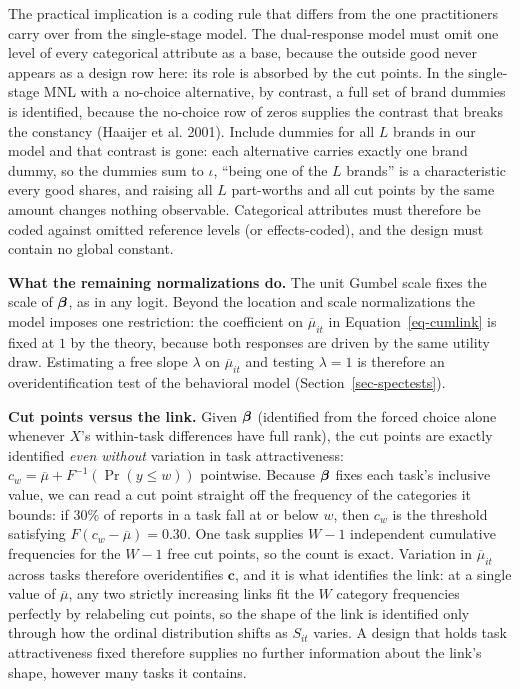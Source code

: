 \documentclass[
  letterpaper,
  DIV=11,
  numbers=noendperiod]{scrartcl}
\theoremstyle{plain}
\theoremstyle{plain}
\theoremstyle{plain}
\theoremstyle{remark}
\begin{document}
The practical implication is a coding rule that differs from the one
practitioners carry over from the single-stage model. The dual-response
model must omit one level of every categorical attribute as a base,
because the outside good never appears as a design row here: its role is
absorbed by the cut points. In the single-stage MNL with a no-choice
alternative, by contrast, a full set of brand dummies is identified,
because the no-choice row of zeros supplies the contrast that breaks the
constancy (Haaijer et al. 2001). Include dummies for all \(L\) brands in
our model and that contrast is gone: each alternative carries exactly
one brand dummy, so the dummies sum to \(\iota\), ``being one of the
\(L\) brands'' is a characteristic every good shares, and raising all
\(L\) part-worths and all cut points by the same amount changes nothing
observable. Categorical attributes must therefore be coded against
omitted reference levels (or effects-coded), and the design must contain
no global constant.

\textbf{What the remaining normalizations do.} The unit Gumbel scale
fixes the scale of \(\boldsymbol{\beta}\), as in any logit. Beyond the location and
scale normalizations the model imposes one restriction: the coefficient
on \(\overline{\mu}_{it}\) in Equation~\ref{eq-cumlink} is fixed at
\(1\) by the theory, because both responses are driven by the same
utility draw. Estimating a free slope \(\lambda\) on
\(\overline{\mu}_{it}\) and testing \(\lambda = 1\) is therefore an
overidentification test of the behavioral model
(Section~\ref{sec-spectests}).

\textbf{Cut points versus the link.} Given \(\boldsymbol{\beta}\) (identified from
the forced choice alone whenever \(X\)'s within-task differences have
full rank), the cut points are exactly identified \emph{even without}
variation in task attractiveness:
\(c_w = \overline{\mu} + F^{-1} \left( \Pr(y \le w) \right)\) pointwise.
Because \(\boldsymbol{\beta}\) fixes each task's inclusive value, we can read a cut
point straight off the frequency of the categories it bounds: if 30\% of
reports in a task fall at or below \(w\), then \(c_w\) is the threshold
satisfying \(F \left( c_w - \overline{\mu} \right) = 0.30\). One task
supplies \(W-1\) independent cumulative frequencies for the \(W-1\) free
cut points, so the count is exact. Variation in \(\overline{\mu}_{it}\)
across tasks therefore overidentifies \(\mathbf{c}\), and it is what
identifies the link: at a single value of \(\overline{\mu}\), any two
strictly increasing links fit the \(W\) category frequencies perfectly
by relabeling cut points, so the shape of the link is identified only
through how the ordinal distribution shifts as \(S_{it}\) varies. A
design that holds task attractiveness fixed therefore supplies no
further information about the link's shape, however many tasks it
contains.
\end{document}
